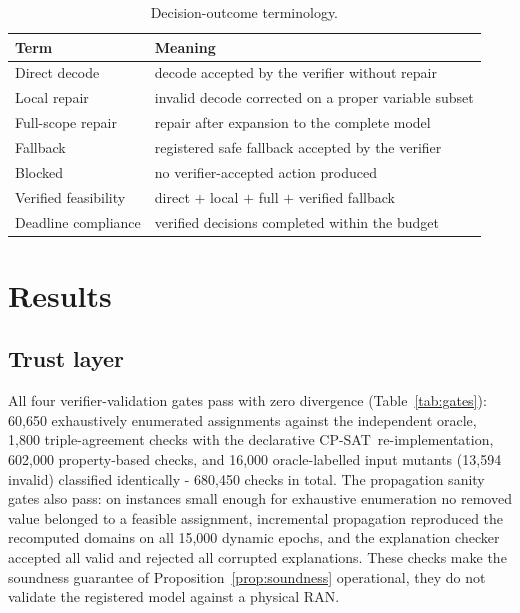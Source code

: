 \documentclass[pdflatex,sn-mathphys-num,iicol,oneside]{sn-jnl}
\newcommand{\cpsat}{\textsc{CP-SAT}}
\begin{document}
\begin{table}[t]
\centering
\caption{Decision-outcome terminology.}
\label{tab:terminology}
\setlength{\tabcolsep}{4pt}\small
\begin{tabular}{p{}p{}}
\toprule
Term & Meaning\\
\midrule
Direct decode & decode accepted by the verifier without repair\\
Local repair & invalid decode corrected on a proper variable subset\\
Full-scope repair & repair after expansion to the complete model\\
Fallback & registered safe fallback accepted by the verifier\\
Blocked & no verifier-accepted action produced\\
Verified feasibility & direct $+$ local $+$ full $+$ verified
fallback\\
Deadline compliance & verified decisions completed within the budget\\
\bottomrule
\end{tabular}
\normalsize
\end{table}

\section{Results}
\label{sec:results}

\subsection{Trust layer}

All four verifier-validation gates pass with zero divergence
(Table~\ref{tab:gates}): 60{,}650 exhaustively enumerated assignments
against the independent oracle, 1{,}800 triple-agreement checks with
the declarative \cpsat\ re-implementation, 602{,}000 property-based
checks, and 16{,}000 oracle-labelled input mutants (13{,}594 invalid)
classified identically - 680{,}450 checks in total. The propagation sanity gates also pass: on instances
small enough for exhaustive enumeration no removed value belonged to a
feasible assignment, incremental propagation reproduced the
recomputed domains on all 15{,}000 dynamic epochs, and the
explanation checker accepted all valid and rejected all corrupted
explanations. These checks make the soundness guarantee of
Proposition~\ref{prop:soundness} operational, they do not validate
the registered model against a physical RAN.
\end{document}
